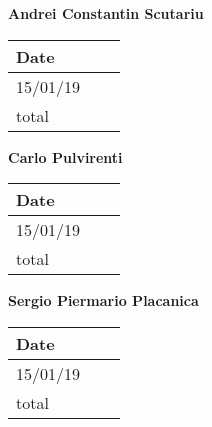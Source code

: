 \documentclass[../main.tex]{subfiles}
\begin{document}
\begin{center}
{\bf Andrei Constantin Scutariu}
	\vspace{2mm}

		\begin{tabular}{p{1.3cm}|p{1.8cm}|p{6.7cm}}
			\hline
			\bf Date & \bf \makebox[1.8cm][c]{Hours} & \bf \makebox[6.7cm][c]{Description} \\
			\hline
			15/01/19 & \makebox[1.8cm][c]{5h} & \makebox[6.7cm][c]{Acceptance testing, Structure of code}\\
			total    & \makebox[1.8cm][c]{5h}
		\end{tabular}
\end{center}
\vspace{1cm}

\begin{center}
	{\bf Carlo Pulvirenti}
	\vspace{2mm}

		\begin{tabular}{p{1.3cm}|p{1.8cm}|p{6.7cm}}
			\hline
			\bf Date & \bf \makebox[1.8cm][c]{Hours} & \bf \makebox[6.7cm][c]{Description} \\
			\hline
			15/01/19 & \makebox[1.8cm][c]{5h} & \makebox[6.7cm][c]{Acceptance testing, Structure of code}\\
			total    & \makebox[1.8cm][c]{5h}
		\end{tabular}
\end{center}

\vspace{1cm}

\begin{center}
	{\bf Sergio Piermario Placanica}
	\vspace{2mm}

		\begin{tabular}{p{1.3cm}|p{1.8cm}|p{6.7cm}}
			\hline
			\bf Date & \bf \makebox[1.8cm][c]{Hours} & \bf \makebox[6.7cm][c]{Description} \\
			\hline
			15/01/19 & \makebox[1.8cm][c]{5h} & \makebox[6.7cm][c]{Acceptance testing, Structure of code}\\
			total    & \makebox[1.8cm][c]{5h}
		\end{tabular}
	\end{center}
\end{document}
